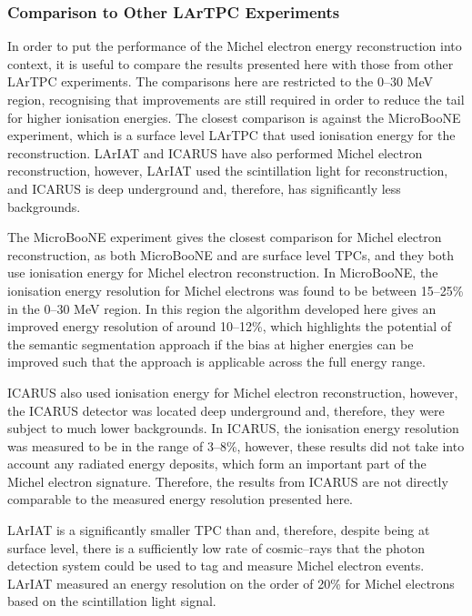 \subsubsection*{Comparison to Other LArTPC Experiments} \label{ME_COMP}

In order to put the performance of the Michel electron energy
reconstruction into context, it is useful to compare the results presented
here with those from other LArTPC experiments. The comparisons here are
restricted to the 0--30 MeV region, recognising that improvements are still 
required in order to reduce the tail for higher ionisation energies. The closest
comparison is against the MicroBooNE experiment, which is a surface level LArTPC
that used ionisation energy for the reconstruction\cite{Acciarri:2017sjy}. 
LArIAT and ICARUS have also performed Michel electron 
reconstruction\cite{Amoruso:2003sw,Foreman_2016}, however, LArIAT used the 
scintillation light for reconstruction, and ICARUS is deep underground and, 
therefore, has significantly less backgrounds.

The MicroBooNE experiment gives the closest comparison for Michel electron
reconstruction, as both MicroBooNE and \protodune{} are surface level TPCs, and
they both use ionisation energy for Michel electron reconstruction. In
MicroBooNE, the ionisation energy resolution for Michel electrons was found to
be between 15--25\% in the 0--30 MeV region\cite{Acciarri:2017sjy}. In this 
region the algorithm developed here gives an improved energy resolution of 
around 10--12\%, which highlights the potential of the semantic segmentation 
approach if the bias at higher energies can be improved such that the approach
is applicable across the full energy range.

ICARUS also used ionisation energy for Michel electron reconstruction, however,
the ICARUS detector was located deep underground and, therefore, they were
subject to much lower backgrounds. In ICARUS, the ionisation energy resolution
was measured to be in the range of 3--8\%\cite{Amoruso:2003sw}, however, these
results did not take into account any radiated energy deposits, which form an
important part of the Michel electron signature. Therefore, the results from
ICARUS are not directly comparable to the measured energy resolution presented
here.

LArIAT is a significantly smaller TPC than \protodune{} and, therefore, despite
being at surface level, there is a sufficiently low rate of cosmic--rays that the
photon detection system could be used to tag and measure Michel electron events.
LArIAT measured an energy resolution on the order of 20\% for Michel electrons
based on the scintillation light signal\cite{Foreman_2016}.

